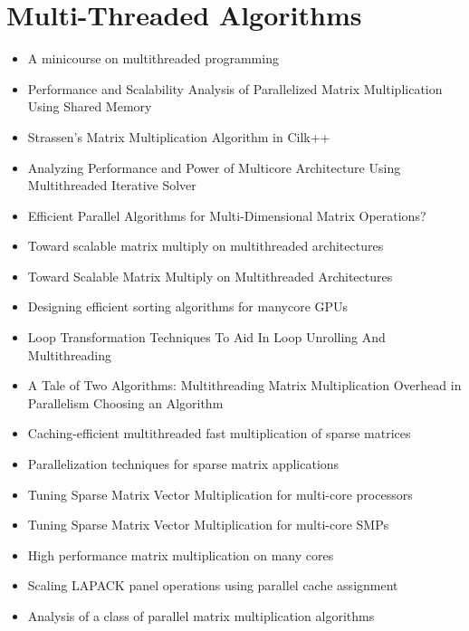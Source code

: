 \section*{Multi-Threaded Algorithms}
\label{sec:lr-multi-threaded-algorithms}

\begin{itemize}
\item A minicourse on multithreaded programming \cite{Leiserson1998}
\item Performance and Scalability Analysis of Parallelized Matrix
  Multiplication Using Shared Memory \cite{Dinkins2007}
\item Strassen's Matrix Multiplication Algorithm in Cilk++
  \cite{Kuszmaul2009}
\item Analyzing Performance and Power of Multicore Architecture Using
  Multithreaded Iterative Solver \cite{Lee2010}
\item Efficient Parallel Algorithms for Multi-Dimensional Matrix
  Operations? \cite{Liu2000}
\item Toward scalable matrix multiply on multithreaded architectures
  \cite{Marker2007}
\item Toward Scalable Matrix Multiply on Multithreaded Architectures
  \cite{Marker2007a}
\item Designing efficient sorting algorithms for manycore GPUs
  \cite{Satish2009}
\item Loop Transformation Techniques To Aid In Loop Unrolling And
  Multithreading \cite{Song2003}
\item A Tale of Two Algorithms: Multithreading Matrix Multiplication
  Overhead in Parallelism Choosing an Algorithm \cite{Steele2010}
\item Caching-efficient multithreaded fast multiplication of sparse
  matrices \cite{Sulatycke1998}
\item Parallelization techniques for sparse matrix applications
  \cite{Ujaldon1996}
\item Tuning Sparse Matrix Vector Multiplication for multi-core
  processors \cite{Williams2007}
\item Tuning Sparse Matrix Vector Multiplication for multi-core SMPs
  \cite{Williams2007a}
\item High performance matrix multiplication on many cores
  \cite{Yuan2009}
\item Scaling LAPACK panel operations using parallel cache assignment
  \cite{Castaldo2010}
\item Analysis of a class of parallel matrix multiplication algorithms

\end{itemize}
